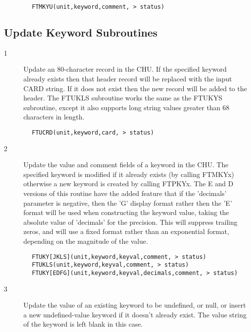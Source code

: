 \documentclass[11pt]{book}
\begin{document}
\begin{verbatim}
        FTMKYU(unit,keyword,comment, > status)
\end{verbatim}

\subsection{Update Keyword Subroutines \label{FTUCRD}}


\begin{description}
\item[1 ] Update an 80-character record in the CHU.  If the specified keyword
    already exists then that header record will be replaced with
    the input CARD string.  If it does not exist then the new record will
    be added to the header.
    The FTUKLS subroutine works the same as the FTUKYS subroutine, except
   it also supports long string values greater than 68 characters in length.
\end{description}

\begin{verbatim}
        FTUCRD(unit,keyword,card, > status)
\end{verbatim}

\begin{description}
\item[2 ] Update the value and comment fields of a keyword in the CHU.
    The specified keyword is modified if it already exists (by calling
    FTMKYx) otherwise a new keyword is created by calling FTPKYx.
     The E and D versions of this routine have the added feature that
     if the 'decimals' parameter is negative, then the 'G' display
     format rather then the 'E' format will be used when constructing
     the keyword value, taking the absolute value of 'decimals' for the
     precision.  This will suppress trailing zeros, and will use a
     fixed format rather than an exponential format,
    depending on the magnitude of the value.
\end{description}

\begin{verbatim}
        FTUKY[JKLS](unit,keyword,keyval,comment, > status)
        FTUKLS(unit,keyword,keyval,comment, > status)
        FTUKY[EDFG](unit,keyword,keyval,decimals,comment, > status)
\end{verbatim}

\begin{description}
\item[3 ] Update the value of an existing keyword to be undefined, or null,
    or insert a new undefined-value keyword if it doesn't already exist.
   The value string of the keyword is left blank in this case.
\end{description}
\end{document}
